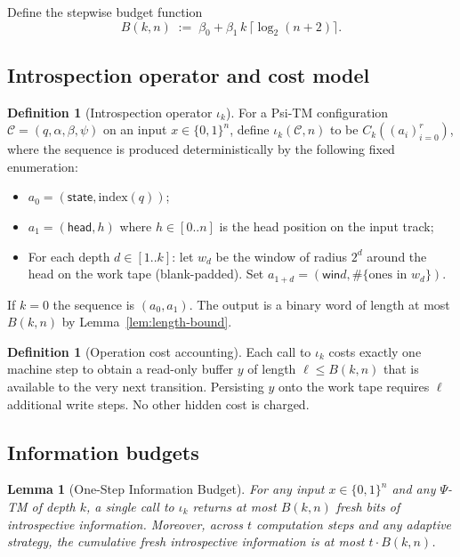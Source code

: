 \documentclass[11pt]{article}
\newtheorem{lemma}[theorem]{Lemma}
\theoremstyle{definition}
\newtheorem{definition}[theorem]{Definition}
\newcommand{\PSi}{\Psi}
\newcommand{\bits}{\{0,1\}}
\begin{document}
Define the stepwise budget function
\begin{equation}
\label{eq:budget}
B(k,n)\;:=\;\beta_0 + \beta_1\,k\,\big\lceil\log_2(n+2)\big\rceil.
\end{equation}

\subsection{Introspection operator and cost model}

\begin{definition}[Introspection operator $\iota_k$]
\label{def:iota-k}
For a Psi-TM configuration $\mathcal{C}=(q,\alpha,\beta,\psi)$ on an input $x\in\bits^n$, define $\iota_k(\mathcal{C},n)$ to be $C_k((a_i)_{i=0}^{r})$, where the sequence is produced deterministically by the following fixed enumeration:
\begin{itemize}
  \item $a_0=(\textsf{state},\mathrm{index}(q))$;
  \item $a_1=(\textsf{head},h)$ where $h\in[0..n]$ is the head position on the input track;
  \item For each depth $d\in[1..k]$: let $w_d$ be the window of radius $2^d$ around the head on the work tape (blank-padded). Set $a_{1+d}=(\textsf{win}d,\#\{\text{ones in }w_d\})$.
\end{itemize}
If $k=0$ the sequence is $(a_0,a_1)$. The output is a binary word of length at most $B(k,n)$ by Lemma~\ref{lem:length-bound}.
\end{definition}

\begin{definition}[Operation cost accounting]
\label{def:cost}
Each call to $\iota_k$ costs exactly one machine step to obtain a read-only buffer $y$ of length $\ell\le B(k,n)$ that is available to the very next transition. Persisting $y$ onto the work tape requires $\ell$ additional write steps. No other hidden cost is charged.
\end{definition}

\subsection{Information budgets}

\begin{lemma}[One-Step Information Budget]
\label{lem:one-step-budget}
For any input $x\in\bits^n$ and any $\PSi$-TM of depth $k$, a single call to $\iota_k$ returns at most $B(k,n)$ fresh bits of introspective information. Moreover, across $t$ computation steps and any adaptive strategy, the cumulative fresh introspective information is at most $t\cdot B(k,n)$.
\end{lemma}
\end{document}
